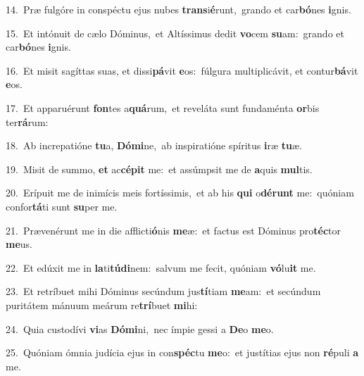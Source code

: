 {\numbfont\textcolor{\numbcolor}{14.}}~Præ fulgóre in conspéctu ejus nubes \textbf{trans}\-i\-\textbf{é}\-runt,~\star grando et car\-\textbf{bó}\-nes \textbf{i}\-gnis.\par
{\numbfont\textcolor{\numbcolor}{15.}}~Et intónuit de cælo Dóminus,~\dagger et Altíssimus dedit \textbf{vo}\-cem \textbf{su}\-am:~\star grando et car\-\textbf{bó}\-nes \textbf{i}\-gnis.\par
{\numbfont\textcolor{\numbcolor}{16.}}~Et misit sagíttas suas, et dissi\-\textbf{pá}\-vit \textbf{e}\-os:~\star fúlgura multiplicávit, et contur\-\textbf{bá}\-vit \textbf{e}\-os.\par
{\numbfont\textcolor{\numbcolor}{17.}}~Et apparuérunt \textbf{fon}\-tes a\-\textbf{quá}\-rum,~\star et reveláta sunt fundaménta \textbf{or}\-bis ter\-\textbf{rá}\-rum:\par
{\numbfont\textcolor{\numbcolor}{18.}}~Ab increpatióne \textbf{tu}\-a, \textbf{Dó}\-\textbf{mi}ne,~\star ab inspiratióne spíritus \textbf{i}\-ræ \textbf{tu}\-æ.\par
{\numbfont\textcolor{\numbcolor}{19.}}~Misit de summo, \textbf{et} ac\-\textbf{cé}\-\textbf{pit} me:~\star et assúmpsit me de \textbf{a}\-quis \textbf{mul}\-tis.\par
{\numbfont\textcolor{\numbcolor}{20.}}~Erípuit me de inimícis meis fortíssimis,~\dagger et ab his \textbf{qui} o\-\textbf{dé}\-\textbf{runt} me:~\star quóniam confor\-\textbf{tá}\-ti sunt \textbf{su}\-per me.\par
{\numbfont\textcolor{\numbcolor}{21.}}~Prævenérunt me in die afflicti\-\textbf{ó}\-nis \textbf{me}\-æ:~\star et factus est Dóminus pro\-\textbf{téc}\-tor \textbf{me}\-us.\par
{\numbfont\textcolor{\numbcolor}{22.}}~Et edúxit me in \textbf{la}\-ti\-\textbf{tú}\-\textbf{di}nem:~\star salvum me fecit, quóniam \textbf{vó}\-lu\textbf{it} me.\par
{\numbfont\textcolor{\numbcolor}{23.}}~Et retríbuet mihi Dóminus secúndum jus\-\textbf{tí}\-tiam \textbf{me}\-am:~\star et secúndum puritátem mánuum meárum re\-\textbf{trí}\-buet \textbf{mi}\-hi:\par
{\numbfont\textcolor{\numbcolor}{24.}}~Quia custodívi \textbf{vi}\-as \textbf{Dó}\-\textbf{mi}ni,~\star nec ímpie gessi a \textbf{De}\-o \textbf{me}\-o.\par
{\numbfont\textcolor{\numbcolor}{25.}}~Quóniam ómnia judícia ejus in con\-\textbf{spéc}\-tu \textbf{me}\-o:~\star et justítias ejus non \textbf{ré}\-puli \textbf{a} me.\par
